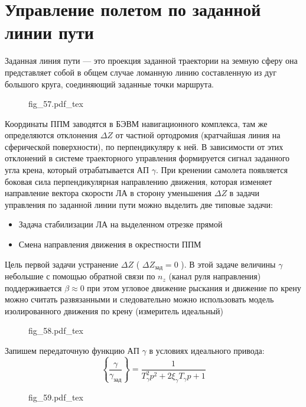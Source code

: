 \documentclass{article}
\newcommand{\incfig}[1]{
    {#1.pdf_tex}
}
\begin{document}
\section{Управление полетом по заданной линии пути}
Заданная линия пути --- это проекция заданной траектории на земную сферу она
представляет собой в общем случае ломанную линию составленную из дуг большого
круга, соединяющий заданные точки маршрута.

\begin{figure}[ht]
    \centering
    \incfig{fig_57}
    \label{fig:fig_57}
\end{figure}

Координаты ППМ заводятся в БЭВМ навигационного комплекса, там же определяются
отклонения $ \Delta Z$ от частной ортодромия (кратчайшая линия на сферической
поверхности), по перпендикуляру к ней. В зависимости от этих отклонений в
системе траекторного управления формируется сигнал заданного угла крена,
который отрабатывается АП $\gamma$. При кренении самолета появляется боковая
сила перпендикулярная направлению движения, которая изменяет направление вектора
скорости ЛА в сторону уменьшения $\Delta Z$
в задачи управления по заданной линии пути можно выделить две типовые задачи:
\begin{itemize}
    \item Задача стабилизации ЛА на выделенном отрезке прямой
    \item Смена направления движения в окрестности ППМ
\end{itemize}
Цель первой задачи устранение $ \Delta Z$ ( $\Delta Z_\text{зад} = 0$ ). В этой
задаче величины $\gamma$ небольшие с помощью обратной связи по $n_z$ (канал
руля направления) поддерживается $\beta \approx 0$ при этом угловое движение
рыскания и движение по крену можно считать развязанными и следовательно можно
использовать модель изолированного движения по крену (измеритель идеальный)

\begin{figure}[H]
    \centering
    \incfig{fig_58}
    \label{fig:fig_58}
\end{figure}

Запишем передаточную функцию АП $\gamma$ в условиях идеального привода:
\[
    \left\{ \frac{\gamma}{\gamma_\text{зад}} \right\}  = \frac{1}{ T_\gamma^2
    p^2 + 2 \xi_\gamma T_\gamma p + 1 }
\]

\begin{figure}[H]
    \centering
    \incfig{fig_59}
    \label{fig:fig_59}
\end{figure}
\end{document}
